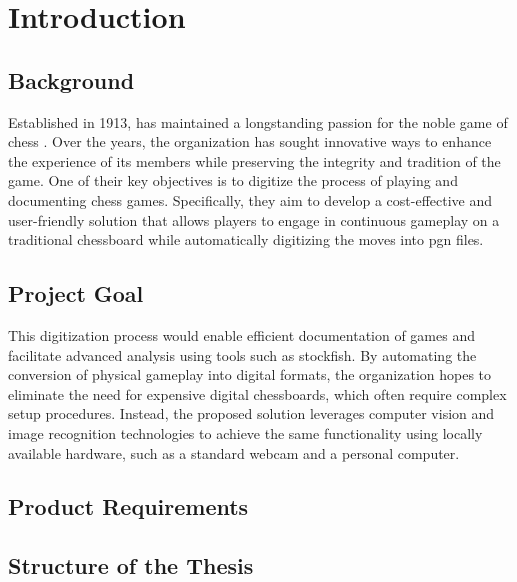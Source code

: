 \chapter{Introduction}

\section{Background}

Established in 1913, \aas has maintained a longstanding passion for the noble game of chess \cite{schaklag:63}. Over the years, the organization has sought innovative ways to enhance the experience of its members while preserving the integrity and tradition of the game. One of their key objectives is to digitize the process of playing and documenting chess games. Specifically, they aim to develop a cost-effective and user-friendly solution that allows players to engage in continuous gameplay on a traditional chessboard while automatically digitizing the moves into \gls{pgn} files.

\section{Project Goal}

This digitization process would enable efficient documentation of games and facilitate advanced analysis using tools such as \gls{stockfish}. By automating the conversion of physical gameplay into digital formats, the organization hopes to eliminate the need for expensive digital chessboards, which often require complex setup procedures. Instead, the proposed solution leverages computer vision and image recognition technologies to achieve the same functionality using locally available hardware, such as a standard webcam and a personal computer.

\section{Product Requirements}



\section{Structure of the Thesis}


